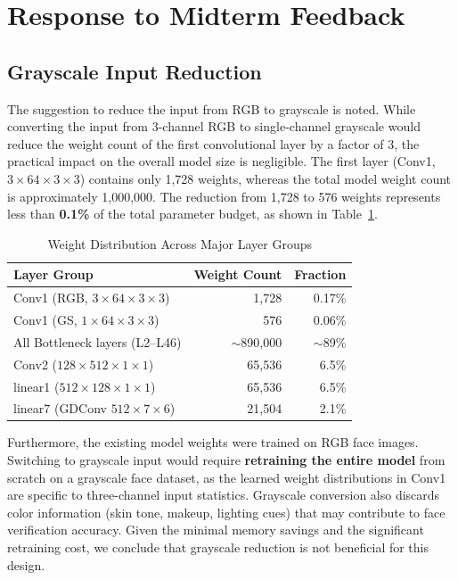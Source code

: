 \section{Response to Midterm Feedback}

\subsection{Grayscale Input Reduction}

The suggestion to reduce the input from RGB to grayscale is noted. While converting the input from 3-channel RGB to single-channel grayscale would reduce the weight count of the first convolutional layer by a factor of 3, the practical impact on the overall model size is negligible. The first layer (Conv1, $3\times64\times3\times3$) contains only 1,728 weights, whereas the total model weight count is approximately 1,000,000. The reduction from 1,728 to 576 weights represents less than \textbf{0.1\%} of the total parameter budget, as shown in Table~\ref{tab:weight_dist}.

\begin{table}[H]
\centering
\caption{Weight Distribution Across Major Layer Groups}
\label{tab:weight_dist}
\begin{tabular}{lrr}
\toprule
\textbf{Layer Group} & \textbf{Weight Count} & \textbf{Fraction} \\
\midrule
Conv1 (RGB, $3\times64\times3\times3$)     & 1,728   & 0.17\% \\
Conv1 (GS, $1\times64\times3\times3$)      & 576     & 0.06\% \\
All Bottleneck layers (L2--L46)            & $\sim$890,000 & $\sim$89\% \\
Conv2 ($128\times512\times1\times1$)       & 65,536  & 6.5\%  \\
linear1 ($512\times128\times1\times1$)     & 65,536  & 6.5\%  \\
linear7 (GDConv $512\times7\times6$)       & 21,504  & 2.1\%  \\
\bottomrule
\end{tabular}
\end{table}

Furthermore, the existing model weights were trained on RGB face images. Switching to grayscale input would require \textbf{retraining the entire model} from scratch on a grayscale face dataset, as the learned weight distributions in Conv1 are specific to three-channel input statistics. Grayscale conversion also discards color information (skin tone, makeup, lighting cues) that may contribute to face verification accuracy. Given the minimal memory savings and the significant retraining cost, we conclude that grayscale reduction is not beneficial for this design.

